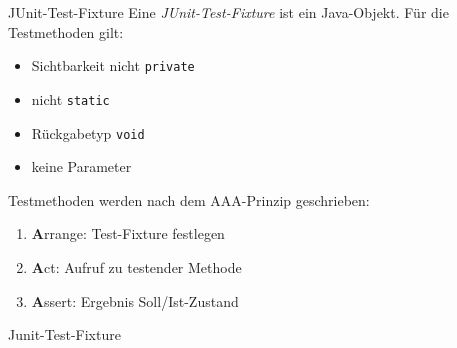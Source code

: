 \begin{defi}{JUnit-Test-Fixture}
    Eine \emph{JUnit-Test-Fixture} ist ein Java-Objekt.
    Für die Testmethoden gilt:
    \begin{itemize}
        \item Sichtbarkeit nicht \texttt{private}
        \item nicht \texttt{static}
        \item Rückgabetyp \texttt{void}
        \item keine Parameter
    \end{itemize}

    Testmethoden werden nach dem AAA-Prinzip geschrieben:
    \begin{enumerate}
        \item \textbf{A}rrange: Test-Fixture festlegen
        \item \textbf{A}ct: Aufruf zu testender Methode
        \item \textbf{A}ssert: Ergebnis Soll/Ist-Zustand
    \end{enumerate}
\end{defi}

\begin{example}{Junit-Test-Fixture}
    

    
\end{example}

